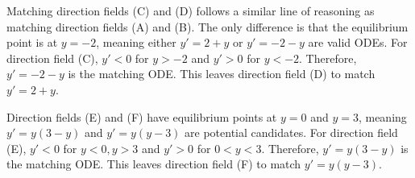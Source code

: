 \begin{enumerate}
    Matching direction fields (C) and (D) follows a similar line of reasoning as matching direction fields (A) and (B). The only difference is that the equilibrium point is at $y = -2$, meaning either $y' = 2 + y$ or $y' = -2-y$ are valid ODEs. For direction field (C), $y' < 0$ for $y > -2$ and $y' > 0$ for $y < -2$. Therefore, $y' = -2 - y$ is the matching ODE. This leaves direction field (D) to match $y' = 2 + y$.
    
    Direction fields (E) and (F) have equilibrium points at $y = 0$ and $y = 3$, meaning $y' = y(3-y)$ and $y' = y(y-3)$ are potential candidates. For direction field (E), $y' < 0$ for $y < 0, y > 3$ and $y' > 0$ for $0 < y < 3$. Therefore, $y' = y(3 - y)$ is the matching ODE. This leaves direction field (F) to match $y' = y(y-3)$.
\end{enumerate}